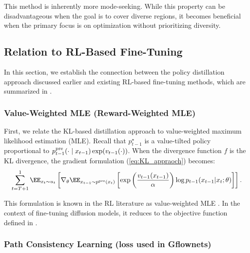 This method is inherently more mode-seeking. While this property can be disadvantageous when the goal is to cover diverse regions, it becomes beneficial when the primary focus is on optimization without prioritizing diversity.









\subsection{Relation to RL-Based Fine-Tuning}

In this section, we establish the connection between the policy distillation approach discussed earlier and existing RL-based fine-tuning methods, which are summarized in \citet{uehara2024understanding}. 

\subsubsection{Value-Weighted MLE (Reward-Weighted MLE)}

First, we relate the KL-based distillation approach to value-weighted maximum likelihood estimation (MLE). Recall that $p^{\star}_{t-1}$ is a value-tilted policy proportional to $p^{\mathrm{pre}}_{t-1}(\cdot \mid x_{t-1})\exp(v_{t-1}(\cdot))$. When the divergence function $f$ is the KL divergence, the gradient formulation (\ref{eq:KL_appraoch}) becomes:
\begin{align*}
      \sum_{t=T+1}^1 \EE_{x_t \sim u_t}\left [ \nabla_{\theta} \EE_{ x_{t-1}\sim p^{\pre}(x_t)}\left [\exp\left ( \frac{v_{t-1}(x_{t-1})}{\alpha} \right)\log p_{t-1}(x_{t-1}|x_t;\theta) \right] \right ]. 
\end{align*}

This formulation is known in the RL literature as value-weighted MLE \citep{peng2019advantage,peters2010relative}. In the context of fine-tuning diffusion models, it reduces to the objective function defined in \citet[Algorithm 3]{uehara2024understanding}. 

\subsubsection{Path Consistency Learning (loss used in Gflownets)}

